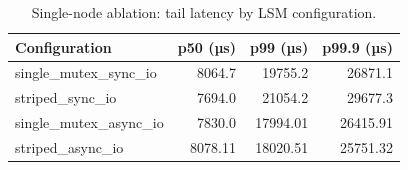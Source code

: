 \begin{table}[t]
\centering
\caption{Single-node ablation: tail latency by LSM configuration.}
\label{tab:ablation}
\small
\begin{tabular}{l r r r}
\toprule
\textbf{Configuration} & \textbf{p50 (µs)} & \textbf{p99 (µs)} & \textbf{p99.9 (µs)} \\
\midrule
single\_mutex\_sync\_io & 8064.7 & 19755.2 & 26871.1 \\
striped\_sync\_io & 7694.0 & 21054.2 & 29677.3 \\
single\_mutex\_async\_io & 7830.0 & 17994.01 & 26415.91 \\
striped\_async\_io & 8078.11 & 18020.51 & 25751.32 \\
\bottomrule
\end{tabular}
\end{table}